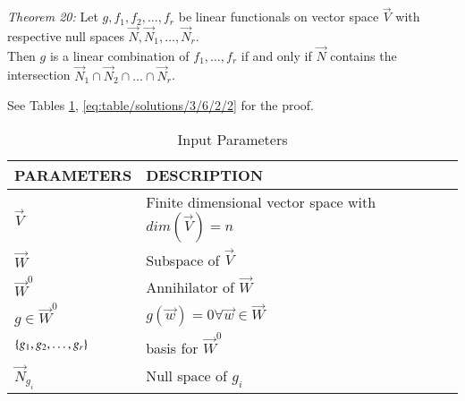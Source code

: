 
%

{\em Theorem 20: }
Let $g,f_1,f_2,\hdots,f_r$ be linear functionals on vector space $\vec{V}$ with respective null spaces $\vec{N},\vec{N}_1,\hdots,\vec{N}_r$.\\Then $g$ is a linear combination of $f_1,\hdots ,f_r$ if and only if $\vec{N}$ contains the intersection $\vec{N}_1 \cap \vec{N}_2\cap \hdots \cap \vec{N}_r$.

See Tables \ref{eq:table/solutions/3/6/2/1}, \ref{eq:table/solutions/3/6/2/2} for the proof.

\begin{table}[!h]
\centering
\resizebox{\columnwidth}{!}
{
\begin{tabular}{|p{3cm}|p{5cm}|}
\hline
\textbf{PARAMETERS}&\textbf{DESCRIPTION}\\
\hline
$\vec{V}$& Finite dimensional vector space with $dim(\vec{V})=n$\\
\hline
$\vec{W}$ & Subspace of $\vec{V}$\\
\hline
$\vec{W}^0$ & Annihilator of $\vec{W}$\\
\hline
$g \in \vec{W}^0$ & $g(\vec{w})=0 \forall \vec{w} \in \vec{W}$\\
\hline
$\left\{g_1,g_2,\hdots,g_r\right\}$& basis for $\vec{W}^0$\\
\hline
$\vec{N}_{g_i}$ & Null space of $g_i$\\
\hline
\end{tabular}
}
\caption{Input Parameters}
\label{eq:table/solutions/3/6/2/1}
\end{table}



